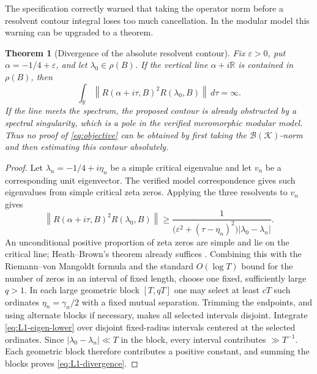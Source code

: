 \documentclass[11pt]{amsart}
\newtheorem{theorem}{Theorem}[section]
\theoremstyle{definition}
\theoremstyle{remark}
\newcommand{\R}{\mathbb R}
\newcommand{\Bcal}{\mathcal B}
\newcommand{\Kcal}{\mathcal K}
\newcommand{\eps}{\varepsilon}
\newcommand{\norm}[1]{\left\lVert #1\right\rVert}
\newcommand{\abs}[1]{\left\lvert #1\right\rvert}
\begin{document}
The specification correctly warned that taking the operator norm before a
resolvent contour integral loses too much cancellation.  In the modular
model this warning can be upgraded to a theorem.

\begin{theorem}[Divergence of the absolute resolvent contour]
\label{thm:L1-divergence}
Fix $\eps>0$, put $\alpha=-1/4+\eps$, and let
$\lambda_0\in\rho(B)$.  If the vertical line
$\alpha+i\R$ is contained in $\rho(B)$, then
\begin{equation}\label{eq:L1-divergence}
 \int_{\R}
 \norm{R(\alpha+i\tau,B)^2R(\lambda_0,B)}\,d\tau=\infty.
\end{equation}
If the line meets the spectrum, the proposed contour is already obstructed
by a spectral singularity, which is a pole in the verified meromorphic
modular model.  Thus no proof of \eqref{eq:objective} can be obtained by first
taking the $\Bcal(\Kcal)$-norm and then estimating this contour absolutely.
\end{theorem}

\begin{proof}
Let $\lambda_n=-1/4+i\eta_n$ be a simple critical eigenvalue and let $v_n$
be a corresponding unit eigenvector.  The verified model correspondence
gives such eigenvalues from simple critical zeta zeros.  Applying the three
resolvents to $v_n$ gives
\begin{equation}\label{eq:L1-eigen-lower}
 \norm{R(\alpha+i\tau,B)^2R(\lambda_0,B)}
 \geq
 \frac1{\bigl(\eps^2+(\tau-\eta_n)^2\bigr)
              \abs{\lambda_0-\lambda_n}}.
\end{equation}
An unconditional positive proportion of zeta zeros are simple and lie on the
critical line; Heath--Brown's theorem already suffices
\cite{HeathBrown1979}.  Combining this with the Riemann--von Mangoldt formula
and the standard $O(\log T)$ bound for the number of zeros in an interval of
fixed length, choose one fixed, sufficiently large $q>1$.  In each large
geometric block $[T,qT]$ one may select at least $cT$ such ordinates
$\eta_n=\gamma_n/2$ with a fixed mutual separation.  Trimming the endpoints,
and using alternate blocks if necessary, makes all selected intervals
disjoint.
Integrate \eqref{eq:L1-eigen-lower} over disjoint fixed-radius intervals
centered at the selected ordinates.  Since
$\abs{\lambda_0-\lambda_n}\ll T$ in the block, every interval contributes
$\gg T^{-1}$.  Each geometric block therefore contributes a positive
constant, and summing the blocks proves \eqref{eq:L1-divergence}.
\end{proof}
\end{document}
